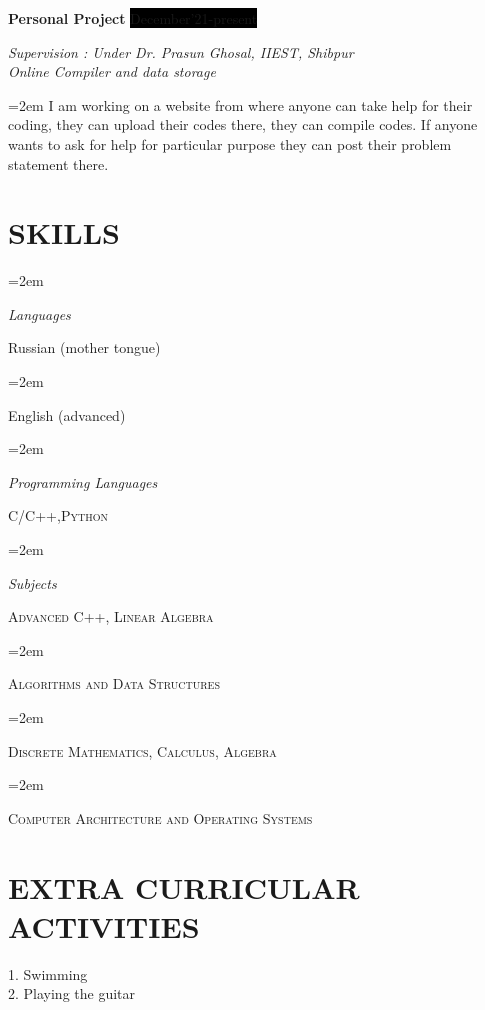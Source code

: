 \documentclass[paper=a4,fontsize=11pt]{scrartcl} %
\newlength{\spacebox}
\newcommand{\sepspace}{\vspace*{1em}}		%
\newcommand{\NewPart}[1]{\section*{\uppercase{#1}}}
\newcommand{\PersonalEntry}[2]{
		\noindent\hangindent=2em\hangafter=0 %
		\parbox{\spacebox}{        %
		\textit{#1}}		       %
		\hspace{1.5em} #2 \par}    %
\newcommand{\SkillsEntry}[2]{      %
		\noindent\hangindent=2em\hangafter=0 %
		\parbox{\spacebox}{        %
		\textit{#1}}			   %
		\hspace{1.5em} #2 \par}    %
\newcommand{\EducationEntry}[4]{
		\noindent \textbf{#1} \hfill      %
		\colorbox{Black}{%
			\parbox{6em}{%
			\hfill\color{White}#2}} \par  %
		\noindent \textit{#3} \par        %
		\noindent\hangindent=2em\hangafter=0 \small #4 %
		\normalsize \par}
\newcommand{\WorkEntry}[4]{				  %
		\noindent \textbf{#1} \hfill      %
		\colorbox{Black}{\color{White}#2} \par  %
		\noindent \textit{#3} \par              %
		\noindent\hangindent=2em\hangafter=0 \small #4 %
		\normalsize \par}
\begin{document}
\WorkEntry{Personal Project}{December'21-present}{Supervision : Under Dr. Prasun Ghosal, IIEST, Shibpur\\Online Compiler and data storage}{I am working on a website from where anyone can take help for their coding, they can upload their codes
there, they can compile codes. If anyone wants to ask for help for particular purpose they can post their
problem statement there.}

\NewPart{Skills}{}

\SkillsEntry{Languages}{Russian (mother tongue)}
\SkillsEntry{}{English (advanced)}
\sepspace

\SkillsEntry{Programming Languages}{\textsc{C/C++},\textsc{Python}}
\sepspace


\SkillsEntry{Subjects}{\textsc{Advanced C++}, \textsc{Linear Algebra}}
\SkillsEntry{}{\textsc{Algorithms and Data Structures}}
\SkillsEntry{}{\textsc{Discrete Mathematics}, \textsc{Calculus}, \textsc{Algebra}}
\SkillsEntry{}{\textsc{Computer Architecture and Operating Systems}}


\NewPart{Extra Curricular Activities}{}
1. Swimming
\\
2. Playing the guitar
\end{document}
